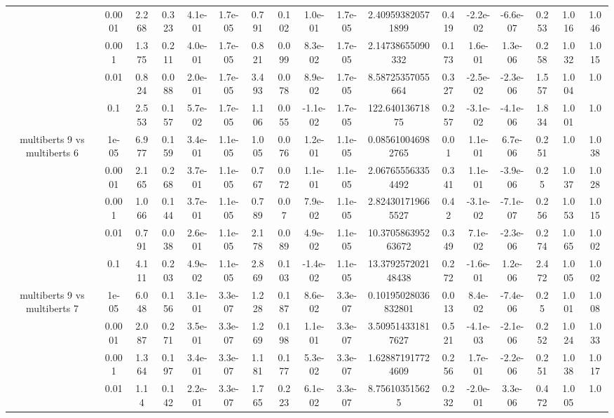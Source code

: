 \begin{tabular}{|c|c|c|c|c|c|c|c|c|c|c|c|c|c|c|c|c|}
 & 0.0001 & 2.268 & 0.323 & 4.1e-01 & 1.7e-05 & 0.791 & 0.102 & 1.0e-01 & 1.7e-05 & 2.409593820571899 & 0.419 & -2.2e-02 & -6.6e-07 & 0.253 & 1.016 & 1.046 \\
 & 0.001 & 1.375 & 0.211 & 4.0e-01 & 1.7e-05 & 0.821 & 0.099 & 8.3e-02 & 1.7e-05 & 2.14738655090332 & 0.173 & 1.6e-01 & 1.3e-06 & 0.258 & 1.032 & 1.015 \\
 & 0.01 & 0.824 & 0.088 & 2.0e-01 & 1.7e-05 & 3.493 & 0.078 & 8.9e-02 & 1.7e-05 & 8.58725357055664 & 0.327 & -2.5e-02 & -2.3e-06 & 1.557 & 1.004 & 1.0 \\
 & 0.1 & 2.553 & 0.157 & 5.7e-02 & 1.7e-05 & 1.106 & 0.055 & -1.1e-02 & 1.7e-05 & 122.64013671875 & 0.257 & -3.1e-02 & -4.1e-06 & 1.834 & 1.001 & 1.0 \\
\hline
\multirow{5}{*}{multiberts 9 vs multiberts 6} & 1e-05 & 6.977 & 0.159 & 3.4e-01 & 1.1e-05 & 1.005 & 0.076 & 1.2e-01 & 1.1e-05 & 0.085610046982765 & 0.01 & 1.1e-01 & 6.7e-06 & 0.251 & 1.0 & 1.038 \\
 & 0.0001 & 2.165 & 0.268 & 3.7e-01 & 1.1e-05 & 0.767 & 0.072 & 1.1e-01 & 1.1e-05 & 2.067655563354492 & 0.341 & 1.1e-01 & -3.9e-06 & 0.25 & 1.037 & 1.028 \\
 & 0.001 & 1.066 & 0.144 & 3.7e-01 & 1.1e-05 & 0.789 & 0.07 & 7.9e-02 & 1.1e-05 & 2.824301719665527 & 0.42 & -3.1e-02 & -7.1e-07 & 0.256 & 1.053 & 1.015 \\
 & 0.01 & 0.791 & 0.038 & 2.6e-01 & 1.1e-05 & 2.178 & 0.089 & 4.9e-02 & 1.1e-05 & 10.370586395263672 & 0.349 & 7.1e-02 & -2.3e-06 & 0.274 & 1.065 & 1.002 \\
 & 0.1 & 4.111 & 0.203 & 4.9e-02 & 1.1e-05 & 2.869 & 0.103 & -1.4e-02 & 1.1e-05 & 13.379257202148438 & 0.272 & -1.6e-01 & 1.2e-06 & 2.472 & 1.005 & 1.002 \\
\hline
\multirow{5}{*}{multiberts 9 vs multiberts 7} & 1e-05 & 6.048 & 0.156 & 3.1e-01 & 3.3e-07 & 1.228 & 0.187 & 8.6e-02 & 3.3e-07 & 0.10195028036832801 & 0.013 & 8.4e-02 & -7.4e-06 & 0.25 & 1.001 & 1.008 \\
 & 0.0001 & 2.087 & 0.271 & 3.5e-01 & 3.3e-07 & 1.269 & 0.198 & 1.1e-01 & 3.3e-07 & 3.509514331817627 & 0.521 & -4.1e-03 & -2.1e-06 & 0.252 & 1.024 & 1.033 \\
 & 0.001 & 1.364 & 0.197 & 3.4e-01 & 3.3e-07 & 1.181 & 0.177 & 5.3e-02 & 3.3e-07 & 1.628871917724609 & 0.256 & 1.7e-01 & -2.2e-06 & 0.251 & 1.038 & 1.017 \\
 & 0.01 & 1.14 & 0.142 & 2.2e-01 & 3.3e-07 & 1.765 & 0.223 & 6.1e-02 & 3.3e-07 & 8.756103515625 & 0.232 & -2.0e-01 & 3.3e-06 & 0.472 & 1.005 & 1.0 \\

\end{tabular}
